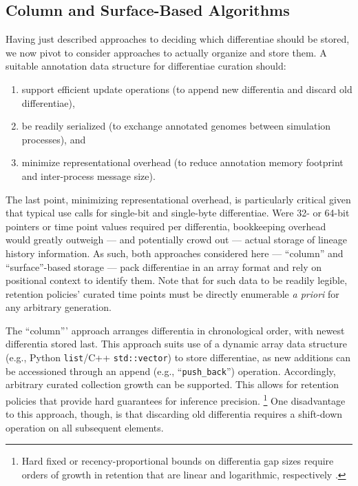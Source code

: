 \subsection{Column and Surface-Based Algorithms}

Having just described approaches to deciding which differentiae should be stored, we now pivot to consider approaches to actually organize and store them.
A suitable annotation data structure for differentiae curation should:
\begin{enumerate}
\item support efficient update operations (to append new differentia and discard old differentiae),
\item be readily serialized (to exchange annotated genomes between simulation processes), and
\item minimize representational overhead (to reduce annotation memory footprint and inter-process message size).
\end{enumerate}

The last point, minimizing representational overhead, is particularly critical given that typical use calls for single-bit and single-byte differentiae.
Were 32- or 64-bit pointers or time point values required per differentia, bookkeeping overhead would greatly outweigh --- and potentially crowd out --- actual storage of lineage history information.
As such, both approaches considered here --- ``column'' and ``surface''-based storage --- pack differentiae in an array format and rely on positional context to identify them.
Note that for such data to be readily legible, retention policies' curated time points must be directly enumerable \textit{a priori} for any arbitrary generation.

The ``column''' approach arranges differentia in chronological order, with newest differentia stored last.
This approach suits use of a dynamic array data structure (e.g., Python \texttt{list}/C++ \texttt{std::vector}) to store differentiae, as new additions can be accessioned through an append (e.g., ``\texttt{push\_back}'') operation.
Accordingly, arbitrary curated collection growth can be supported.
This allows for retention policies that provide hard guarantees for inference precision.
\footnote{%
Hard fixed or recency-proportional bounds on differentia gap sizes require orders of growth in retention that are linear and logarithmic, respectively \citep{moreno2024algorithms}.
}
One disadvantage to this approach, though, is that discarding old differentia requires a shift-down operation on all subsequent elements.


